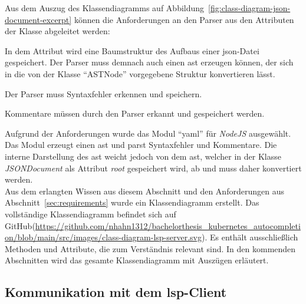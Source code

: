 Aus dem Auszug des Klassendiagramms auf Abbildung~\ref{fig:class-diagram-json-document-excerpt} können die Anforderungen an
den Parser aus den Attributen der Klasse abgeleitet werden:
\begin{description}
  \setlength\itemsep{-0.5cm}
  \item[root]
        In dem Attribut wird eine Baumstruktur des Aufbaus einer \ac{json}-Datei gespeichert. Der Parser muss demnach auch einen \ac{ast} erzeugen können,
        der sich in die von der Klasse ``ASTNode'' vorgegebene Struktur konvertieren lässt.
  \item[syntaxErrors] Der Parser muss Syntaxfehler erkennen und speichern.
  \item[comments] Kommentare müssen durch den Parser erkannt und gespeichert werden.
\end{description}

Aufgrund der Anforderungen wurde das Modul ``yaml'' für \textit{NodeJS} ausgewählt. Das Modul erzeugt einen \ac{ast} und parst Syntaxfehler und Kommentare.
Die interne Darstellung des \ac{ast} weicht jedoch von dem \ac{ast}, welcher in der Klasse \textit{JSONDocument} als Attribut \textit{root}
gespeichert wird, ab und muss daher konvertiert werden.
\\
Aus dem erlangten Wissen aus diesem Abschnitt und den Anforderungen aus Abschnitt~\ref{sec:requirements} wurde ein Klassendiagramm erstellt.
Das vollständige Klassendiagramm befindet sich auf GitHub(\url{https://github.com/nhahn1312/bachelorthesis_kubernetes_autocompletion/blob/main/src/images/class-diagram-lsp-server.svg}).
Es enthält ausschließlich Methoden und Attribute, die zum Verständnis relevant sind.
In den kommenden Abschnitten wird das gesamte Klassendiagramm mit Auszügen erläutert.

\subsection{Kommunikation mit dem \acs{lsp}-Client}\label{sec:lsp-client-communication}

